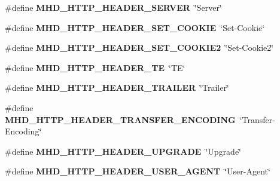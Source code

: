\begin{DoxyCompactItemize}
\item 
\hypertarget{group__headers_gacb648e26888538cc47c237a58f0ef216}{\#define {\bfseries \-M\-H\-D\-\_\-\-H\-T\-T\-P\-\_\-\-H\-E\-A\-D\-E\-R\-\_\-\-S\-E\-R\-V\-E\-R}~\char`\"{}\-Server\char`\"{}}\label{group__headers_gacb648e26888538cc47c237a58f0ef216}

\item 
\hypertarget{group__headers_ga600e2769a0a5edf5fb507fb1033d78cf}{\#define {\bfseries \-M\-H\-D\-\_\-\-H\-T\-T\-P\-\_\-\-H\-E\-A\-D\-E\-R\-\_\-\-S\-E\-T\-\_\-\-C\-O\-O\-K\-I\-E}~\char`\"{}\-Set-\/\-Cookie\char`\"{}}\label{group__headers_ga600e2769a0a5edf5fb507fb1033d78cf}

\item 
\hypertarget{group__headers_ga5e135c9d9fe03f98de0c39fb40baa09b}{\#define {\bfseries \-M\-H\-D\-\_\-\-H\-T\-T\-P\-\_\-\-H\-E\-A\-D\-E\-R\-\_\-\-S\-E\-T\-\_\-\-C\-O\-O\-K\-I\-E2}~\char`\"{}\-Set-\/\-Cookie2\char`\"{}}\label{group__headers_ga5e135c9d9fe03f98de0c39fb40baa09b}

\item 
\hypertarget{group__headers_gae5fe14b72335a864b0c4d44dfc2a4ab4}{\#define {\bfseries \-M\-H\-D\-\_\-\-H\-T\-T\-P\-\_\-\-H\-E\-A\-D\-E\-R\-\_\-\-T\-E}~\char`\"{}\-T\-E\char`\"{}}\label{group__headers_gae5fe14b72335a864b0c4d44dfc2a4ab4}

\item 
\hypertarget{group__headers_gac6bec481f3a98f8bf69473815e0f5161}{\#define {\bfseries \-M\-H\-D\-\_\-\-H\-T\-T\-P\-\_\-\-H\-E\-A\-D\-E\-R\-\_\-\-T\-R\-A\-I\-L\-E\-R}~\char`\"{}\-Trailer\char`\"{}}\label{group__headers_gac6bec481f3a98f8bf69473815e0f5161}

\item 
\hypertarget{group__headers_ga572d4e11930c1055054e784e4663b137}{\#define {\bfseries \-M\-H\-D\-\_\-\-H\-T\-T\-P\-\_\-\-H\-E\-A\-D\-E\-R\-\_\-\-T\-R\-A\-N\-S\-F\-E\-R\-\_\-\-E\-N\-C\-O\-D\-I\-N\-G}~\char`\"{}\-Transfer-\/\-Encoding\char`\"{}}\label{group__headers_ga572d4e11930c1055054e784e4663b137}

\item 
\hypertarget{group__headers_gaaa5adc6859dc97fcdda428715c9a5f86}{\#define {\bfseries \-M\-H\-D\-\_\-\-H\-T\-T\-P\-\_\-\-H\-E\-A\-D\-E\-R\-\_\-\-U\-P\-G\-R\-A\-D\-E}~\char`\"{}\-Upgrade\char`\"{}}\label{group__headers_gaaa5adc6859dc97fcdda428715c9a5f86}

\item 
\hypertarget{group__headers_ga8b91f1e69b57c8ebbd52bbbfdaecac86}{\#define {\bfseries \-M\-H\-D\-\_\-\-H\-T\-T\-P\-\_\-\-H\-E\-A\-D\-E\-R\-\_\-\-U\-S\-E\-R\-\_\-\-A\-G\-E\-N\-T}~\char`\"{}\-User-\/\-Agent\char`\"{}}\label{group__headers_ga8b91f1e69b57c8ebbd52bbbfdaecac86}


\end{DoxyCompactItemize}
